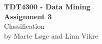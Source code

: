 
\begin{titlepage}
	\begin{center}

	
		{\Huge \bf TDT4300 - Data Mining} \\[2.0cm]
		{\Huge \bf Assignment 3} \\[6.0cm]


		{\Huge Classification} \\[8.0cm]


		{\Large by Marte Løge and Linn Vikre} \\[1.0cm]


	\end{center}
\end{titlepage}